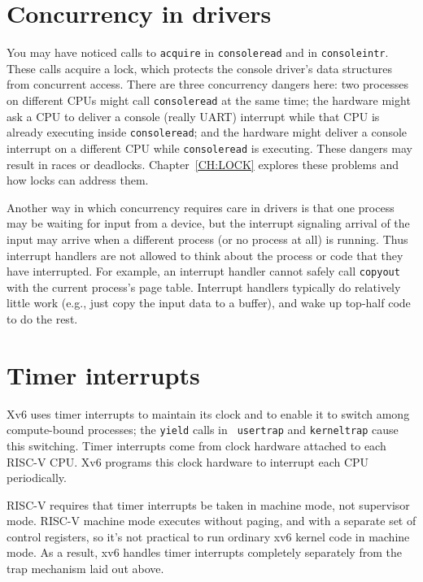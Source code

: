 \section{Concurrency in drivers}

You may have noticed calls to {\tt acquire} in {\tt consoleread}
and in {\tt consoleintr}. These calls acquire a lock, which protects
the console driver's data structures from concurrent access.
There are three concurrency dangers here: two processes on
different CPUs might call {\tt consoleread} at the same time;
the hardware might ask a CPU to deliver a console (really 
UART) interrupt while that CPU is already executing inside
{\tt consoleread};
and the hardware might deliver a console interrupt on
a different CPU while {\tt consoleread} is executing.
These dangers may result in races or deadlocks.
Chapter~\ref{CH:LOCK} explores these problems and how locks can
address them.

Another way in which concurrency requires care in drivers is that one
process may be waiting for input from a device, but the interrupt
signaling arrival of the input may arrive when a different process (or
no process at all) is running. Thus interrupt handlers are not allowed
to think about the process or code that they have interrupted. For
example, an interrupt handler cannot safely call {\tt copyout} with
the current process's page table. Interrupt handlers typically do
relatively little work (e.g., just copy the input data to a buffer),
and wake up top-half code to do the rest.

\section{Timer interrupts}

Xv6 uses timer interrupts to maintain its clock and to enable it to
switch among compute-bound processes; the {\tt yield} calls in {\tt
  usertrap} and {\tt kerneltrap} cause this switching. Timer
interrupts come from clock hardware attached to each RISC-V CPU. Xv6
programs this clock hardware to interrupt each CPU periodically.

RISC-V requires that timer interrupts be taken in machine mode, not
supervisor mode. RISC-V machine mode executes without paging, and with
a separate set of control registers, so it's not practical to run
ordinary xv6 kernel code in machine mode. As a result, xv6 handles
timer interrupts completely separately from the trap mechanism laid
out above.



